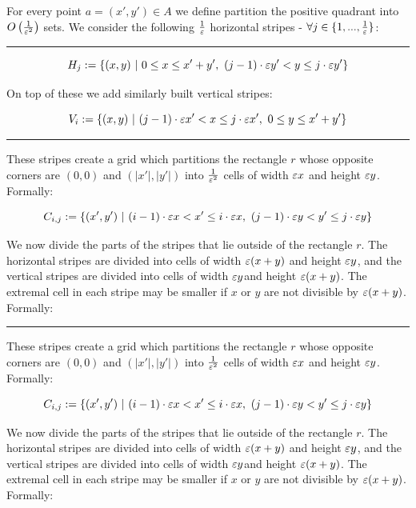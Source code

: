 \documentclass[12pt]{article}%
\begin{document}
    For every point $a = (x',y') \in A$ we define partition the
    positive quadrant into $O\left(\frac{1}{\varepsilon^2}\right)$ sets. We
    consider the following $\frac{1}{\varepsilon}$ horizontal stripes -
    $\forall j\in \{1,...,\frac{1}{\varepsilon}\}$:

    \hrule

\begin{equation}
    H_{j}:=\{(x,y)~|~  0 \leq x \leq x'+y'  ,~ (j-1)\cdot \varepsilon y' < y
    \leq j\cdot \varepsilon y'\}
\end{equation}

On top of these we add similarly built vertical stripes:

\begin{equation}
    V_{i}:=\{(x,y)~|~ (j-1)\cdot \varepsilon x' < x \leq j\cdot \varepsilon x',~ 0
    \leq y \leq x'+y' \}
\end{equation}

\hrule

These stripes create a grid which partitions the rectangle $r$ whose
opposite corners are $(0,0)$ and $(|x'|,|y'|)$ into $\frac{1}{\varepsilon^2}$
cells of width $\varepsilon x$ and height $\varepsilon y$. Formally:

\begin{equation}
    C_{i,j}:=\{(x',y')~|~  (i-1)\cdot \varepsilon x < x' \leq i\cdot \varepsilon x,~
    (j-1)\cdot \varepsilon y< y' \leq j\cdot \varepsilon y\}
\end{equation}

We now divide the parts of the stripes that lie outside of the
rectangle $r$. The horizontal stripes are divided into cells of width
$\varepsilon(x+y)$ and height $\varepsilon y$, and the vertical stripes are divided
into cells of width $\varepsilon y$and height $\varepsilon(x+y)$. The extremal cell
in each stripe may be smaller if $x$ or $y$ are not divisible by
$\varepsilon(x+y)$. Formally:

\hrule

These stripes create a grid which partitions the rectangle $r$ whose
opposite corners are $(0,0)$ and $(|x'|,|y'|)$ into $\frac{1}{\varepsilon^2}$
cells of width $\varepsilon x$ and height $\varepsilon y$. Formally:

\begin{equation}
    C_{i,j}:=\{(x',y')~|~  (i-1)\cdot \varepsilon x < x' \leq i\cdot \varepsilon x,~
    (j-1)\cdot \varepsilon y< y' \leq j\cdot \varepsilon y\}
\end{equation}

We now divide the parts of the stripes that lie outside of the
rectangle $r$. The horizontal stripes are divided into cells of width
$\varepsilon(x+y)$ and height $\varepsilon y$, and the vertical stripes are divided
into cells of width $\varepsilon y$and height $\varepsilon(x+y)$. The extremal cell
in each stripe may be smaller if $x$ or $y$ are not divisible by
$\varepsilon(x+y)$. Formally:
\end{document}
